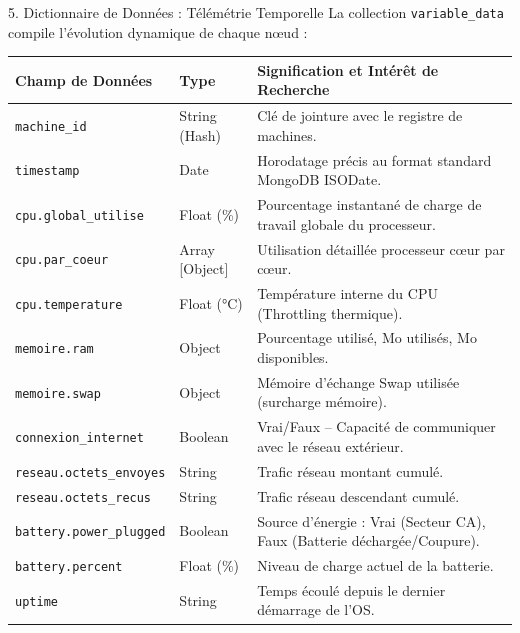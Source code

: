 \documentclass[10pt,aspectratio=169]{beamer}
\begin{document}
\begin{frame}{5. Dictionnaire de Données : Télémétrie Temporelle}
  La collection \texttt{variable\_data} compile l'évolution dynamique de chaque nœud :
  
  \begin{table}[]
    \centering
    \tiny
    \begin{tabular}{lll}
      \toprule
      \textbf{Champ de Données} & \textbf{Type} & \textbf{Signification et Intérêt de Recherche} \\
      \midrule
      \texttt{machine\_id} & String (Hash) & Clé de jointure avec le registre de machines. \\
      \texttt{timestamp} & Date & Horodatage précis au format standard MongoDB ISODate. \\
      \texttt{cpu.global\_utilise} & Float (\%) & Pourcentage instantané de charge de travail globale du processeur. \\
      \texttt{cpu.par\_coeur} & Array [Object] & Utilisation détaillée processeur cœur par cœur. \\
      \texttt{cpu.temperature} & Float (°C) & Température interne du CPU (Throttling thermique). \\
      \texttt{memoire.ram} & Object & Pourcentage utilisé, Mo utilisés, Mo disponibles. \\
      \texttt{memoire.swap} & Object & Mémoire d'échange Swap utilisée (surcharge mémoire). \\
      \texttt{connexion\_internet} & Boolean & Vrai/Faux -- Capacité de communiquer avec le réseau extérieur. \\
      \texttt{reseau.octets\_envoyes} & String & Trafic réseau montant cumulé. \\
      \texttt{reseau.octets\_recus} & String & Trafic réseau descendant cumulé. \\
      \texttt{battery.power\_plugged} & Boolean & Source d'énergie : Vrai (Secteur CA), Faux (Batterie déchargée/Coupure). \\
      \texttt{battery.percent} & Float (\%) & Niveau de charge actuel de la batterie. \\
      \texttt{uptime} & String & Temps écoulé depuis le dernier démarrage de l'OS. \\
      \bottomrule
    \end{tabular}
  \end{table}
\end{frame}
\end{document}
